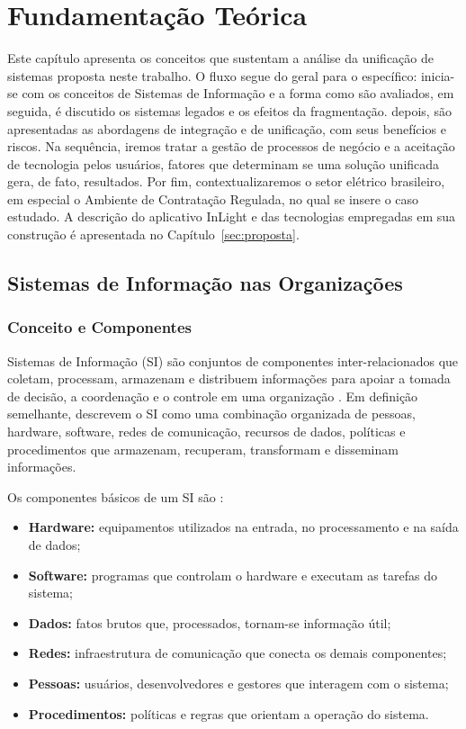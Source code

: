 \chapter{Fundamentação Teórica}
\label{sec:fundamentacao}

Este capítulo apresenta os conceitos que sustentam a análise da unificação de sistemas proposta neste trabalho. O fluxo segue do geral para o específico: inicia-se com os conceitos de Sistemas de Informação e a forma como são avaliados, em seguida, é discutido os sistemas legados e os efeitos da fragmentação. depois, são apresentadas as abordagens de integração e de unificação, com seus benefícios e riscos. Na sequência, iremos tratar a gestão de processos de negócio e a aceitação de tecnologia pelos usuários, fatores que determinam se uma solução unificada gera, de fato, resultados. Por fim, contextualizaremos o setor elétrico brasileiro, em especial o Ambiente de Contratação Regulada, no qual se insere o caso estudado. A descrição do aplicativo InLight e das tecnologias empregadas em sua construção é apresentada no Capítulo~\ref{sec:proposta}.

\section{Sistemas de Informação nas Organizações}
\label{sec:si}

\subsection{Conceito e Componentes}

Sistemas de Informação (SI) são conjuntos de componentes inter-relacionados que coletam, processam, armazenam e distribuem informações para apoiar a tomada de decisão, a coordenação e o controle em uma organização \citep{laudon2020}. Em definição semelhante, \citet{obrien2013} descrevem o SI como uma combinação organizada de pessoas, hardware, software, redes de comunicação, recursos de dados, políticas e procedimentos que armazenam, recuperam, transformam e disseminam informações.

Os componentes básicos de um SI são \citep{stair2018}:

\begin{itemize}
    \item \textbf{Hardware:} equipamentos utilizados na entrada, no processamento e na saída de dados;
    \item \textbf{Software:} programas que controlam o hardware e executam as tarefas do sistema;
    \item \textbf{Dados:} fatos brutos que, processados, tornam-se informação útil;
    \item \textbf{Redes:} infraestrutura de comunicação que conecta os demais componentes;
    \item \textbf{Pessoas:} usuários, desenvolvedores e gestores que interagem com o sistema;
    \item \textbf{Procedimentos:} políticas e regras que orientam a operação do sistema.
\end{itemize}

